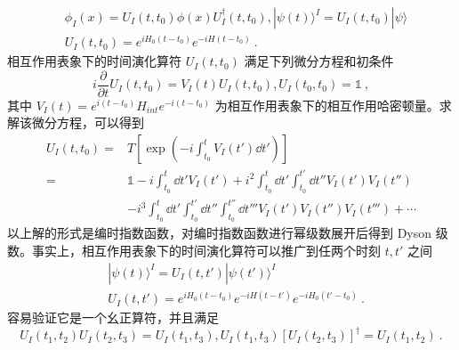 \begin{equation}
\begin{aligned}
&\phi_I(x)=U_I(t,t_0)\phi(x)U_I^\dagger(t,t_0),|\psi(t)\rangle^I=U_I(t,t_0)|\psi\rangle\\ 
&U_I(t,t_0)=e^{iH_0(t-t_0)}e^{-iH(t-t_0)}~.
\end{aligned}
\end{equation}
相互作用表象下的时间演化算符 $U_I(t,t_0)$ 满足下列微分方程和初条件
\begin{equation}
i\frac{\partial}{\partial t}U_I(t,t_0)=V_I(t)U_I(t,t_0), U_I(t_0,t_0)=\mathbb{1}~,
\end{equation}
其中 $V_I(t)=e^{i(t-t_0)}H_{int} e^{-i(t-t_0)}$ 为相互作用表象下的相互作用哈密顿量。求解该微分方程，可以得到
\begin{equation}
\begin{aligned}
U_I(t,t_0)=&T\left[\exp\left(-i\int_{t_0}^{t}V_I(t')\dd t'\right)\right]\\
=&\mathbb{1}-i\int_{t_0}^t \dd t' V_I(t')+i^2\int_{t_0}^t \dd t'  \int_{t_0}^{t'} \dd t'' V_I(t')V_I(t'') \\
 &-i^3\int_{t_0}^t \dd t'  \int_{t_0}^{t'} \dd t'' \int_{t_0}^{t''}\dd t''' V_I(t')V_I(t'')V_I(t''')+\cdots
\end{aligned}
\end{equation}
以上解的形式是编时指数函数，对编时指数函数进行幂级数展开后得到 Dyson 级数。事实上，相互作用表象下的时间演化算符可以推广到任两个时刻 $t,t'$ 之间
\begin{equation}\label{eq_Ipic_1}
\begin{aligned}
& |\psi(t)\rangle^I=U_I(t,t')|\psi(t')\rangle^I\\
& U_I(t,t')=e^{iH_0(t-t_0)}e^{-iH(t-t')}e^{-iH_0(t'-t_0)}~.
\end{aligned}
\end{equation}
容易验证它是一个幺正算符，并且满足
\begin{equation}
U_I(t_1,t_2)U_I(t_2,t_3)=U_I(t_1,t_3), U_I(t_1,t_3)[U_I(t_2,t_3)]^\dagger=U_I(t_1,t_2)~.
\end{equation}

